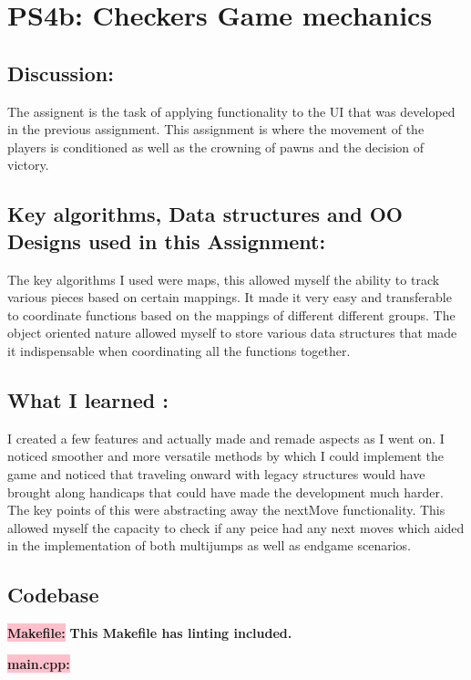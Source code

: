 \section{PS4b: Checkers Game mechanics}\label{sec:ps4b}
\graphicspath{{ps4b}}
\subsection{Discussion:}\label{sec:ps4b:disc}
The assignent is the task of applying functionality to the UI that was developed in the previous assignment. This 
assignment is where the movement of the players is conditioned as well as the crowning of pawns and the decision of victory. 
\subsection{Key algorithms, Data structures and OO Designs used in this Assignment:}
The key algorithms I used were maps, this allowed myself the ability to track various pieces based on certain mappings. 
It made it very easy and transferable to coordinate functions based on the mappings of different different groups. The object oriented nature allowed myself 
to store various data structures that made it indispensable when coordinating all the functions together. 

\subsection{What I learned :}
I created a few features and actually made and remade aspects as I went on. I noticed smoother and more versatile 
methods by which I could implement the game and noticed that traveling onward with legacy structures would have 
brought along handicaps that could have made the development much harder. The key points of this were abstracting away the nextMove functionality.
This allowed myself the capacity to check if any peice had any next moves which aided in the implementation of both multijumps as well as endgame scenarios.
\subsection{Codebase}\label{sec:ps4b:code}

\textbf{\colorbox{pink}{Makefile:}} \newline \textbf{This Makefile has linting included.}


\textbf{\colorbox{pink}{main.cpp:}} 


